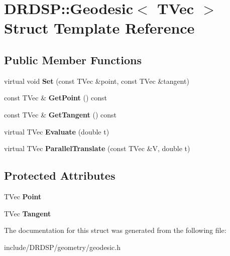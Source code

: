 \hypertarget{struct_d_r_d_s_p_1_1_geodesic}{\section{D\-R\-D\-S\-P\-:\-:Geodesic$<$ T\-Vec $>$ Struct Template Reference}
\label{struct_d_r_d_s_p_1_1_geodesic}
}
\subsection*{Public Member Functions}
\begin{DoxyCompactItemize}
\item 
\hypertarget{struct_d_r_d_s_p_1_1_geodesic_adbe5b874998ae05965c4743d05f9d9f2}{virtual void {\bfseries Set} (const T\-Vec \&point, const T\-Vec \&tangent)}\label{struct_d_r_d_s_p_1_1_geodesic_adbe5b874998ae05965c4743d05f9d9f2}

\item 
\hypertarget{struct_d_r_d_s_p_1_1_geodesic_a7c9365578a93c484a762d00b8326ea4f}{const T\-Vec \& {\bfseries Get\-Point} () const }\label{struct_d_r_d_s_p_1_1_geodesic_a7c9365578a93c484a762d00b8326ea4f}

\item 
\hypertarget{struct_d_r_d_s_p_1_1_geodesic_abe5e93e0cadb4cf672c34857e6eb776a}{const T\-Vec \& {\bfseries Get\-Tangent} () const }\label{struct_d_r_d_s_p_1_1_geodesic_abe5e93e0cadb4cf672c34857e6eb776a}

\item 
\hypertarget{struct_d_r_d_s_p_1_1_geodesic_a7151a62079dd6aee49c5ee572aa9f659}{virtual T\-Vec {\bfseries Evaluate} (double t)}\label{struct_d_r_d_s_p_1_1_geodesic_a7151a62079dd6aee49c5ee572aa9f659}

\item 
\hypertarget{struct_d_r_d_s_p_1_1_geodesic_a72765c1bb3c224bc3f738863c85bab46}{virtual T\-Vec {\bfseries Parallel\-Translate} (const T\-Vec \&V, double t)}\label{struct_d_r_d_s_p_1_1_geodesic_a72765c1bb3c224bc3f738863c85bab46}

\end{DoxyCompactItemize}
\subsection*{Protected Attributes}
\begin{DoxyCompactItemize}
\item 
\hypertarget{struct_d_r_d_s_p_1_1_geodesic_a22554954743fb723aba0255edd316a44}{T\-Vec {\bfseries Point}}\label{struct_d_r_d_s_p_1_1_geodesic_a22554954743fb723aba0255edd316a44}

\item 
\hypertarget{struct_d_r_d_s_p_1_1_geodesic_a7a645623e8edc301cfdebf163cc619ef}{T\-Vec {\bfseries Tangent}}\label{struct_d_r_d_s_p_1_1_geodesic_a7a645623e8edc301cfdebf163cc619ef}

\end{DoxyCompactItemize}


The documentation for this struct was generated from the following file\-:\begin{DoxyCompactItemize}
\item 
include/\-D\-R\-D\-S\-P/geometry/geodesic.\-h\end{DoxyCompactItemize}
